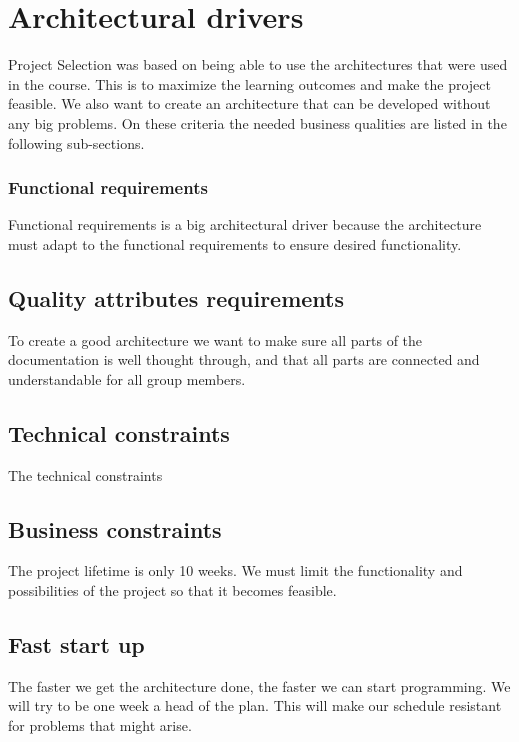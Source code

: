 \section{Architectural drivers}

Project Selection was based on being able to use the architectures that were used in the course. This is to maximize the learning outcomes and make the project feasible. We also want to create an architecture that can be developed without any big problems. On these criteria the needed business qualities are listed in the following sub-sections.

\subsubsection{Functional requirements}
Functional requirements is a big architectural driver because the architecture must adapt to the functional requirements to ensure desired functionality.
 
\subsection{Quality attributes requirements}
To create a good architecture we want to make sure all parts of the documentation is well thought through, and that all parts are connected and understandable for all group members.

\subsection{Technical constraints}
The technical constraints 

\subsection{Business constraints}
The project lifetime is only 10 weeks. We must limit the functionality and possibilities of the project so that it becomes feasible.

\subsection{Fast start up}
The faster we get the architecture done, the faster we can start programming. We will try to be one week a head of the plan. This will make our schedule resistant for problems that might arise.



